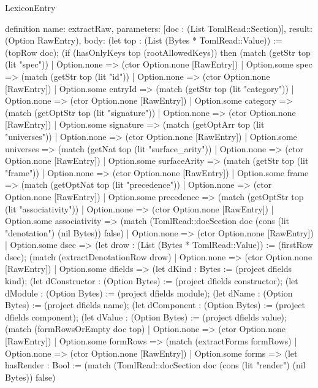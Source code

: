 \begin{lexlean}{LexiconEntry}
\begin{semanticmodule}
definition{
  name: extractRaw,
  parameters: [doc : (List TomlRead::Section)],
  result: (Option RawEntry),
  body: (let top : (List (Bytes * TomlRead::Value)) := (topRow doc); (if (hasOnlyKeys top (rootAllowedKeys)) then (match (getStr top (lit "spec"))
    | Option.none => (ctor Option.none [RawEntry])
    | Option.some spec => (match (getStr top (lit "id"))
      | Option.none => (ctor Option.none [RawEntry])
      | Option.some entryId => (match (getStr top (lit "category"))
        | Option.none => (ctor Option.none [RawEntry])
        | Option.some category => (match (getOptStr top (lit "signature"))
          | Option.none => (ctor Option.none [RawEntry])
          | Option.some signature => (match (getOptArr top (lit "universes"))
            | Option.none => (ctor Option.none [RawEntry])
            | Option.some universes => (match (getNat top (lit "surface_arity"))
              | Option.none => (ctor Option.none [RawEntry])
              | Option.some surfaceArity => (match (getStr top (lit "frame"))
                | Option.none => (ctor Option.none [RawEntry])
                | Option.some frame => (match (getOptNat top (lit "precedence"))
                  | Option.none => (ctor Option.none [RawEntry])
                  | Option.some precedence => (match (getOptStr top (lit "associativity"))
                    | Option.none => (ctor Option.none [RawEntry])
                    | Option.some associativity => (match (TomlRead::docSection doc (cons (lit "denotation") (nil Bytes)) false)
                      | Option.none => (ctor Option.none [RawEntry])
                      | Option.some dsec => (let drow : (List (Bytes * TomlRead::Value)) := (firstRow dsec); (match (extractDenotationRow drow)
                        | Option.none => (ctor Option.none [RawEntry])
                        | Option.some dfields => (let dKind : Bytes := (project dfields kind); (let dConstructor : (Option Bytes) := (project dfields constructor); (let dModule : (Option Bytes) := (project dfields module); (let dName : (Option Bytes) := (project dfields name); (let dComponent : (Option Bytes) := (project dfields component); (let dValue : (Option Bytes) := (project dfields value); (match (formRowsOrEmpty doc top)
                          | Option.none => (ctor Option.none [RawEntry])
                          | Option.some formRows => (match (extractForms formRows)
                            | Option.none => (ctor Option.none [RawEntry])
                            | Option.some forms => (let hasRender : Bool := (match (TomlRead::docSection doc (cons (lit "render") (nil Bytes)) false)
}
\end{semanticmodule}
\end{lexlean}
